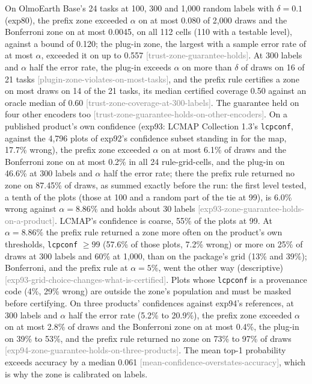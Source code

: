 \documentclass[11pt,a4paper]{article}
\newcommand{\claim}[1]{{\scriptsize\textsf{\textcolor{gray}{[#1]}}}}
\newcommand{\code}[1]{\texttt{#1}}
\begin{document}
On OlmoEarth Base's 24 tasks at 100, 300 and 1,000 random labels with $\delta = 0.1$ (exp80), the prefix zone exceeded
$\alpha$ on at most 0.080 of 2,000 draws and the Bonferroni zone on at most 0.0045, on all 112 cells (110 with a
testable level), against a bound of 0.120; the plug-in zone, the largest with a sample error rate of at most $\alpha$, exceeded it on up to 0.557
\claim{trust-zone-guarantee-holds}. At 300 labels and $\alpha$ half the error rate, the plug-in exceeds $\alpha$ on more
than $\delta$ of draws on 16 of 21 tasks \claim{plugin-zone-violates-on-most-tasks}, and the prefix rule certifies a
zone on most draws on 14 of the 21 tasks, its median certified coverage 0.50 against an oracle median of 0.60
\claim{trust-zone-coverage-at-300-labels}. The guarantee held on four other encoders too
\claim{trust-zone-guarantee-holds-on-other-encoders}. On a published product's own confidence (exp93: LCMAP Collection
1.3's \code{lcpconf}, against the 4,796 plots of exp92's confidence subset standing in for the map, 17.7\% wrong), the
prefix zone exceeded $\alpha$ on at most 6.1\% of draws and the Bonferroni zone on at most 0.2\% in all 24
rule-grid-cells, and the plug-in on 46.6\% at 300 labels and $\alpha$ half the error rate; there the prefix rule
returned no zone on 87.45\% of draws, as summed exactly before the run: the first level tested, a tenth of the plots
(those at 100 and a random part of the tie at 99), is 6.0\% wrong against $\alpha = 8.86\%$ and holds about 30
labels \claim{exp93-zone-guarantee-holds-on-a-product}. LCMAP's confidence is coarse, 55\% of the plots at 99. At
$\alpha = 8.86\%$ the prefix rule returned a zone more often on the product's own thresholds, \code{lcpconf} $\geq 99$
(57.6\% of those plots, 7.2\% wrong) or more on 25\% of draws at 300 labels and 60\% at 1,000, than on the package's
grid (13\% and 39\%); Bonferroni, and the prefix rule at $\alpha = 5\%$, went the other way (descriptive)
\claim{exp93-grid-choice-changes-what-is-certified}. Plots whose \code{lcpconf} is a provenance code (4\%, 29\% wrong) are
outside the zone's population and must be masked before certifying. On three products' confidences against
exp94's references, at 300 labels and $\alpha$ half the error rate (5.2\% to 20.9\%), the prefix zone exceeded $\alpha$
on at most 2.8\% of draws and the Bonferroni zone on at most 0.4\%, the plug-in on 39\% to 53\%, and the prefix rule
returned no zone on 73\% to 97\% of draws \claim{exp94-zone-guarantee-holds-on-three-products}. The mean top-1 probability exceeds accuracy by a median 0.061
\claim{mean-confidence-overstates-accuracy}, which is why the zone is calibrated on labels.
\end{document}
